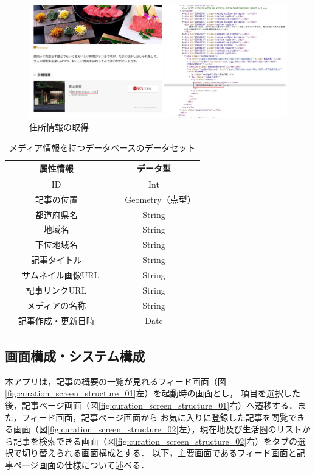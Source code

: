 \documentclass[a4paper]{jsarticle}
\begin{document}
\begin{enumerate}
\begin{enumerate}
\fifigure
\begin{figure}[H]
  \begin{center}
    \includegraphics[width=0.95\hsize]{./images/curation_scraping_article.jpg}
    \caption{住所情報の取得}
    \label{fig:curation-scraping-article}
  \end{center}
\end{figure}
\fi

\begin{table}[H]
  \begin{center}
    \caption{メディア情報を持つデータベースのデータセット}
    \renewcommand\arraystretch{1.4}
    \begin{tabular}{|c|c|}
      \hline
      属性情報 & データ型 \\
      \hline
      \hline
      ID & Int \\
      \hline
      記事の位置 & 　Geometry（点型）　 \\
      \hline
      都道府県名 & String \\
      \hline
      地域名 & String \\
      \hline
      下位地域名 & String \\
      \hline
      記事タイトル & String \\
      \hline
      　サムネイル画像URL　 & String \\
      \hline
      記事リンクURL & String \\
      \hline
      メディアの名称 & String \\
      \hline
      記事作成・更新日時 & Date \\
      \hline
    \end{tabular}
    \label{tab:curation-database}
  \end{center}
\end{table}


\subsection{画面構成・システム構成}
本アプリは，記事の概要の一覧が見れるフィード画面（図\ref{fig:curation_screen_structure_01}左）を起動時の画面とし，
項目を選択した後，記事ページ画面（図\ref{fig:curation_screen_structure_01}右）へ遷移する．また，フィード画面，記事ページ画面から
お気に入りに登録した記事を閲覧できる画面（図\ref{fig:curation_screen_structure_02}左），現在地及び生活圏のリストから記事を検索できる画面（図\ref{fig:curation_screen_structure_02}右）をタブの選択で切り替えられる画面構成とする．
以下，主要画面であるフィード画面と記事ページ画面の仕様について述べる．


\end{enumerate}
\end{enumerate}
\end{document}
